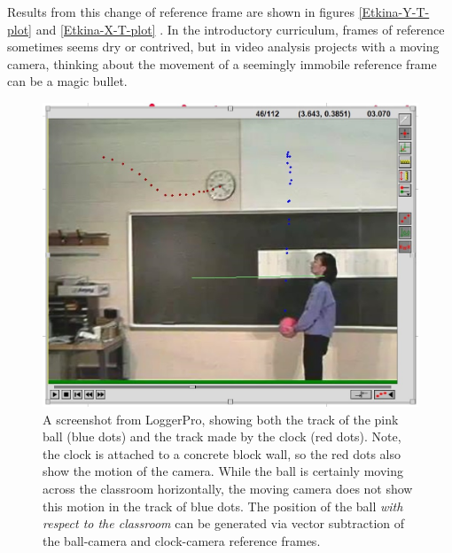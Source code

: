 \documentclass[prb,twocolumn]{revtex4-2}
\begin{document}
Results from this change of reference frame are shown in figures \ref{Etkina-Y-T-plot} and \ref{Etkina-X-T-plot} . 
In the introductory curriculum, frames of reference sometimes seems dry or contrived, but in video analysis projects with a moving camera, thinking about the movement of a seemingly immobile reference frame can be a magic bullet.


\begin{figure}[h]
\centering
\includegraphics[width=\columnwidth]{Etkina-dots-2.jpg}
\caption{
A screenshot from LoggerPro, showing both the track of the pink ball (blue dots) and the track made by the clock (red dots).  Note, the clock is attached to a concrete block wall, so the red dots also show the motion of the camera.  
While the ball is certainly moving across the classroom horizontally, the moving camera does not show this motion in the track of blue dots.
The position of the ball \textit{with respect to the classroom} can be generated via vector subtraction of the ball-camera and clock-camera reference frames.
}
\label{Etkina-dots-2}
\end{figure}
\end{document}
